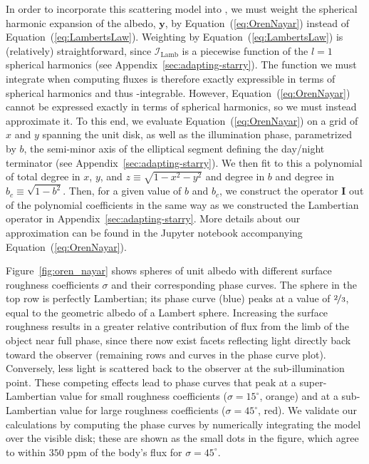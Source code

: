 \documentclass[modern]{aastex62}
\begin{document}
In order to incorporate this scattering model into \starry, we must weight
the spherical harmonic expansion of the albedo, $\mathbf{y}$, by
Equation~(\ref{eq:OrenNayar}) instead of Equation~(\ref{eq:LambertsLaw}).
Weighting by Equation~(\ref{eq:LambertsLaw}) is (relatively) straightforward,
since $\mathcal{I}_\text{Lamb}$ is a piecewise function of the $l=1$ spherical
harmonics (see Appendix~\ref{sec:adapting-starry}).
The function we must integrate when computing fluxes is therefore
exactly expressible in terms of spherical harmonics and thus
\starry-integrable. However, Equation~(\ref{eq:OrenNayar}) cannot be expressed
exactly in terms of spherical harmonics, so we must instead approximate it.
To this end, we evaluate Equation~(\ref{eq:OrenNayar}) on a
grid of $x$ and $y$ spanning the unit disk, as well as the illumination phase,
parametrized by $b$, the semi-minor axis of the elliptical segment defining
the day/night terminator (see Appendix~\ref{sec:adapting-starry}).
We then fit to this a polynomial of total degree \STARRYORENNAYARDEG
in $x$, $y$, and $z \equiv \sqrt{1 - x^2 - y^2}$ and degree
\STARRYORENNAYARNB in $b$ and degree \STARRYORENNAYARNBC in
$b_c \equiv \sqrt{1 - b^2}$.
%
Then, for a given value of $b$ and $b_c$, we construct the operator
$\mathbf{I}$ out of the polynomial coefficients in the same way as we
constructed the Lambertian operator in Appendix~\ref{sec:adapting-starry}.
%
More details about our approximation can be found in the Jupyter notebook
accompanying Equation~(\ref{eq:OrenNayar}).

Figure~\ref{fig:oren_nayar} shows spheres of unit albedo
with different surface roughness
coefficients $\sigma$ and their corresponding phase curves.
The sphere in the top row is perfectly Lambertian; its phase curve (blue)
peaks at a value of $\nicefrac{2}{3}$, equal to the geometric albedo
of a Lambert sphere. Increasing the surface roughness results in a greater
relative contribution of flux from the limb of the object near full
phase, since there now exist facets reflecting light directly back toward the
observer (remaining rows and curves in the phase curve plot).
Conversely, less light is scattered
back to the observer at the
sub-illumination point. These competing effects lead to phase curves that
peak at a super-Lambertian value for small roughness
coefficients ($\sigma = 15^\circ$, orange) and at a sub-Lambertian value for
large roughness coefficients ($\sigma = 45^\circ$, red).
%
We validate our calculations by computing the phase curves by numerically
integrating the \citet{OrenNayar1994} model over the visible disk; these
are shown as the small dots in the figure, which agree to within
$350$ ppm of the body's flux for $\sigma = 45^\circ$.
\end{document}
